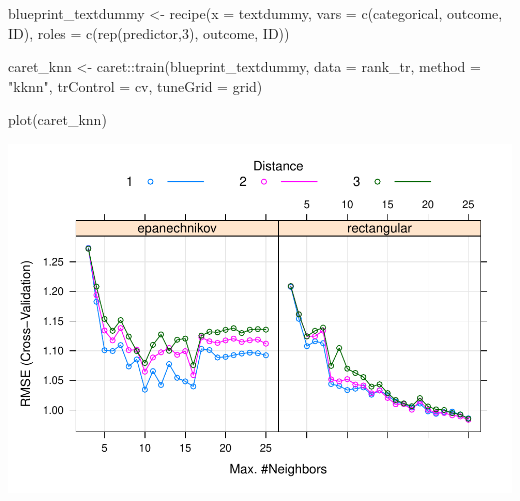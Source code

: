 \documentclass[
  english,
  man]{apa6}
\newenvironment{Shaded}{\begin{snugshade}}{\end{snugshade}}
\newcommand{\AttributeTok}[1]{\textcolor[rgb]{0.77,0.63,0.00}{#1}}
\newcommand{\DecValTok}[1]{\textcolor[rgb]{0.00,0.00,0.81}{#1}}
\newcommand{\FunctionTok}[1]{\textcolor[rgb]{0.00,0.00,0.00}{#1}}
\newcommand{\NormalTok}[1]{#1}
\newcommand{\OtherTok}[1]{\textcolor[rgb]{0.56,0.35,0.01}{#1}}
\newcommand{\SpecialCharTok}[1]{\textcolor[rgb]{0.00,0.00,0.00}{#1}}
\newcommand{\StringTok}[1]{\textcolor[rgb]{0.31,0.60,0.02}{#1}}
\begin{document}
\begin{Shaded}
\begin{Highlighting}[]
\NormalTok{blueprint\_textdummy }\OtherTok{\textless{}{-}} \FunctionTok{recipe}\NormalTok{(}\AttributeTok{x  =}\NormalTok{ textdummy,}
                    \AttributeTok{vars  =} \FunctionTok{c}\NormalTok{(categorical, outcome, ID),}
                    \AttributeTok{roles =} \FunctionTok{c}\NormalTok{(}\FunctionTok{rep}\NormalTok{(}\StringTok{\textquotesingle{}predictor\textquotesingle{}}\NormalTok{,}\DecValTok{3}\NormalTok{), }\StringTok{\textquotesingle{}outcome\textquotesingle{}}\NormalTok{, }\StringTok{\textquotesingle{}ID\textquotesingle{}}\NormalTok{)) }


\NormalTok{  caret\_knn }\OtherTok{\textless{}{-}}\NormalTok{ caret}\SpecialCharTok{::}\FunctionTok{train}\NormalTok{(blueprint\_textdummy, }
                                        \AttributeTok{data      =}\NormalTok{ rank\_tr,}
                                        \AttributeTok{method    =} \StringTok{"kknn"}\NormalTok{,}
                                        \AttributeTok{trControl =}\NormalTok{ cv,}
                                        \AttributeTok{tuneGrid  =}\NormalTok{ grid)}
  
  \FunctionTok{plot}\NormalTok{(caret\_knn)}
\end{Highlighting}
\end{Shaded}

\includegraphics{capstone640_files/figure-latex/unnamed-chunk-4-1.pdf}

\begin{Shaded}
\end{Shaded}
\end{document}
